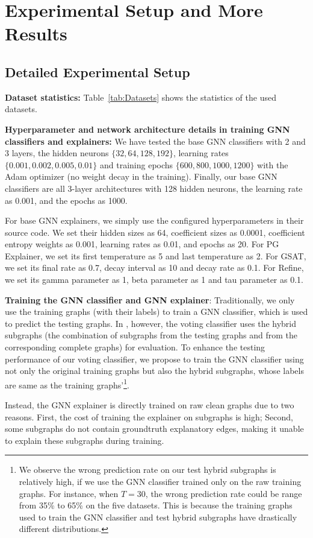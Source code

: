 \section{Experimental Setup and More Results}
\label{app:evaluation}


{
\subsection{Detailed Experimental Setup}
\label{app:setup}

{\bf Dataset statistics:} Table~\ref{tab:Datasets} shows the statistics of the used datasets. 


{\bf Hyperparameter and network architecture details in training GNN classifiers and explainers:}  We have tested the base GNN classifiers with 2 and 3 layers, the hidden neurons $\{32, 64, 128, 192\}$, learning rates $\{0.001, 0.002, 0.005, 0.01\}$ and training epochs $\{600, 800, 1000, 1200\}$ with the Adam optimizer (no weight decay in the training). Finally, our base GNN classifiers are all 3-layer architectures with 128 hidden neurons, the learning rate as 0.001, and the epochs as 1000. 

For base GNN explainers, we simply use the configured hyperparameters in their source code. We set their hidden sizes as 64, coefficient sizes as 0.0001, coefficient entropy weights as 0.001, learning rates as 0.01, and epochs as 20. For PG Explainer, we set its first temperature as 5 and last temperature as 2. For GSAT, we set its final rate as 0.7, decay interval as 10 and decay rate as 0.1. For Refine, we set its gamma parameter as 1, beta parameter as 1 and tau parameter as 0.1.

}

 {{\bf Training the GNN classifier and GNN explainer}: Traditionally, we only use the training graphs (with their labels) to train a GNN classifier, which is used to predict the testing graphs. In {\name}, however, the voting classifier uses the hybrid subgraphs (the combination of subgraphs from the testing graphs and from the corresponding complete graphs) 
for evaluation. To enhance the testing performance of our voting classifier, we propose to train  the GNN classifier using not only the original training graphs but also the hybrid subgraphs, whose labels are same as the training graphs'\footnote{We observe the wrong prediction rate on our test hybrid subgraphs is relatively high, if we use the GNN classifier trained only on the raw training graphs. For instance, when $T=30$, the wrong prediction rate could be range from 35\% to 65\% on the five datasets. This is because the training graphs used to train the GNN classifier and test hybrid subgraphs have drastically different distributions. 
}.

Instead, the GNN  explainer is directly trained on raw clean graphs due to two reasons. First, the cost of training the explainer on subgraphs is high; Second, some subgraphs do not contain groundtruth explanatory edges, making it unable to explain these subgraphs during training.    
}


